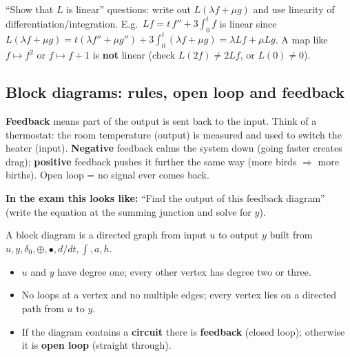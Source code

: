 \begin{exambox}
``Show that $L$ is linear'' questions: write out $L(\lambda f+\mu g)$ and use linearity of differentiation/integration.
E.g.\ $Lf=t\,f''+3\int_0^t f$ is linear since $L(\lambda f+\mu g)=t(\lambda f''+\mu g'')+3\int_0^t(\lambda f+\mu g)=\lambda Lf+\mu Lg$.
A map like $f\mapsto f^2$ or $f\mapsto f+1$ is \textbf{not} linear (check $L(2f)\neq 2Lf$, or $L(0)\neq0$).
\end{exambox}

\subsection{Block diagrams: rules, open loop and feedback \texorpdfstring{}{}}\label{ss:1-2}
\begin{plainbox}
\textbf{Feedback} means part of the output is sent back to the input. Think of a thermostat: the room temperature (output)
is measured and used to switch the heater (input). \textbf{Negative} feedback calms the system down (going faster creates drag);
\textbf{positive} feedback pushes it further the same way (more birds $\Rightarrow$ more births). Open loop = no signal ever comes back.
\par\smallskip\textbf{In the exam this looks like:} ``Find the output of this feedback diagram'' (write the equation at the summing junction and solve for $y$).
\end{plainbox}
\begin{defbox}
A block diagram is a directed graph from input $u$ to output $y$ built from $u,y,\delta_0,\oplus,\bullet,d/dt,\int,a,h$.
\begin{itemize}
\item $u$ and $y$ have degree one; every other vertex has degree two or three.
\item No loops at a vertex and no multiple edges; every vertex lies on a directed path from $u$ to $y$.
\item If the diagram contains a \textbf{circuit} there is \textbf{feedback} (closed loop); otherwise it is \textbf{open loop} (straight through).
\end{itemize}
\end{defbox}

